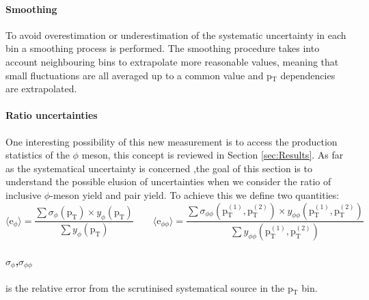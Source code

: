 \paragraph{Smoothing}
To avoid overestimation or underestimation of the systematic uncertainty in each bin a smoothing process is performed. The smoothing procedure takes into account neighbouring bins to extrapolate more reasonable values, meaning that small fluctuations are all averaged up to a common value and p$_{\text{T}}$ dependencies are extrapolated.

\paragraph{Ratio uncertainties}
One interesting possibility of this new measurement is to access the production statistics of the $\phi$ meson, this concept is reviewed in Section \ref{sec:Results}. As far as the systematical uncertainty is concerned ,the goal of this section is to understand the possible elusion of uncertainties when we consider the ratio of inclusive $\phi$-meson yield and pair yield. To achieve this we define two quantities:
\begin{equation}
\langle \text{e}_{\phi}\rangle = \frac{\sum \sigma_{\phi}(\text{p}_{\text{T}}) \times y_{\phi}(\text{p}_{\text{T}})}{\sum y_{\phi}(\text{p}_{\text{T}})} \qquad \langle \text{e}_{\phi\phi}\rangle = \frac{\sum \sigma_{\phi\phi}(\text{p}_{\text{T}}^{(1)},\text{p}_{\text{T}}^{(2)}) \times y_{\phi\phi}(\text{p}_{\text{T}}^{(1)},\text{p}_{\text{T}}^{(2)})}{\sum y_{\phi\phi}(\text{p}_{\text{T}}^{(1)},\text{p}_{\text{T}}^{(2)})} 
\label{}
\end{equation}
\paragraph{$\sigma_{\phi}$,$\sigma_{\phi\phi}$} is the relative error from the scrutinised systematical source in the p$_{\text{T}}$ bin.
